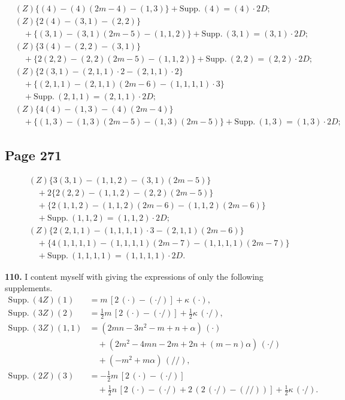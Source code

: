 \documentclass[11pt,a4paper]{article}
\theoremstyle{definition}
\begin{document}
\begin{align*}
&(Z)\{(4) - (4)(2m-4) - (1,3)\} + \text{Supp.}\ (4) = (4) \cdot 2D;\\
&(Z)\{2(4) - (3,1) - (2,2)\}\\
&\quad + \{(3,1) - (3,1)(2m-5) - (1,1,2)\} + \text{Supp.}\ (3,1) = (3,1) \cdot 2D;\\
&(Z)\{3(4) - (2,2) - (3,1)\}\\
&\quad + \{2(2,2) - (2,2)(2m-5) - (1,1,2)\} + \text{Supp.}\ (2,2) = (2,2) \cdot 2D;\\
&(Z)\{2(3,1) - (2,1,1) \cdot 2 - (2,1,1) \cdot 2\}\\
&\quad + \{(2,1,1) - (2,1,1)(2m-6) - (1,1,1,1) \cdot 3\}\\
&\quad + \text{Supp.}\ (2,1,1) = (2,1,1) \cdot 2D;\\
&(Z)\{4(4) - (1,3) - (4)(2m-4)\}\\
&\quad + \{(1,3) - (1,3)(2m-5) - (1,3)(2m-5)\} + \text{Supp.}\ (1,3) = (1,3) \cdot 2D;
\end{align*}

\subsection*{Page 271}

\begin{align*}
&(Z)\{3(3,1) - (1,1,2) - (3,1)(2m-5)\}\\
&\quad + 2\{2(2,2) - (1,1,2) - (2,2)(2m-5)\}\\
&\quad + \{2(1,1,2) - (1,1,2)(2m-6) - (1,1,2)(2m-6)\}\\
&\quad + \text{Supp.}\ (1,1,2) = (1,1,2) \cdot 2D;\\
&(Z)\{2(2,1,1) - (1,1,1,1) \cdot 3 - (2,1,1)(2m-6)\}\\
&\quad + \{4(1,1,1,1) - (1,1,1,1)(2m-7) - (1,1,1,1)(2m-7)\}\\
&\quad + \text{Supp.}\ (1,1,1,1) = (1,1,1,1) \cdot 2D.
\end{align*}

\medskip
\noindent\textbf{110.} I content myself with giving the expressions of only the following supplements.
\begin{align*}
\text{Supp.}\ (4Z)(1) &= m\,[2\,(\cdot) - (\cdot /)] + \kappa\,(\cdot),\\
\text{Supp.}\ (3Z)(2) &= \tfrac{1}{2}m\,[2\,(\cdot) - (\cdot /)] + \tfrac{1}{2}\kappa\,(\cdot /),\\
\text{Supp.}\ (3Z)(1,1) &= (2mn - 3n^2 - m + n + \alpha)\,(\cdot)\\
&\quad + (2m^2 - 4mn - 2m + 2n + (m - n)\alpha)\,(\cdot /)\\
&\quad + (-m^2 + m\alpha)\,(//),\\
\text{Supp.}\ (2Z)(3) &= -\tfrac{1}{2}m\,[2\,(\cdot) - (\cdot /)]\\
&\quad + \tfrac{1}{2}n\,[2\,(\cdot) - (\cdot /) + 2\,(2\,(\cdot /) - (//))] + \tfrac{1}{2}\kappa\,(\cdot /).
\end{align*}
\end{document}
